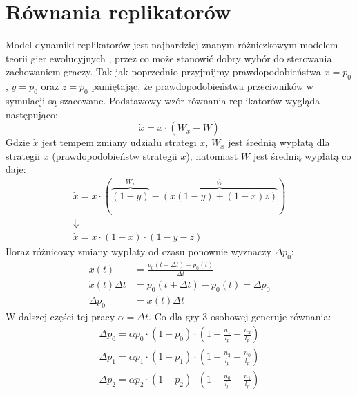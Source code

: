 
\section{Równania replikatorów}
\label{sec:r_repli}
Model dynamiki replikatorów jest najbardziej znanym różniczkowym modelem teorii gier ewolucyjnych \cite{Now06}\cite{Hof98}, przez co może stanowić dobry wybór do sterowania zachowaniem graczy. Tak jak poprzednio przyjmijmy prawdopodobieństwa $x=p_0$, $y=p_0$ oraz $z=p_0$ pamiętając, że prawdopodobieństwa przeciwników w symulacji są szacowane. Podstawowy wzór równania replikatorów wygląda następująco:
\begin{equation}
\dot{x} = x \cdot ( W_x - \overline{W})
\end{equation}
Gdzie $\dot{x}$ jest tempem zmiany udziału strategi $x$, $W_x$ jest średnią wypłatą dla strategii $x$ (prawdopodobieństw strategii $x$), natomiast $\overline{W}$ jest średnią wypłatą co daje:
\begin{gather*}
\dot{x} = x \cdot ( \overbrace{(1-y)}^{W_x} - \overbrace{(x(1-y) + (1-x)z)}^{\overline{W}}) \\
\Downarrow \\
\dot{x} = x \cdot (1-x) \cdot (1-y-z)
\end{gather*}
Iloraz różnicowy zmiany wypłaty od czasu ponownie wyznaczy $\Delta p_0$:
\begin{align*}
\dot{x}(t) &= \frac{p_0(t+\Delta t)-p_0(t)}{\Delta t} \\
\dot{x}(t) \Delta t &= p_0(t+\Delta t)-p_0(t) = \Delta p_0 \\
\Delta p_0 &= \dot{x}(t) \Delta t
\end{align*} 
W dalszej części tej pracy $\alpha=\Delta t$. Co dla gry 3-osobowej generuje równania:
\begin{align} \label{eq:repli}
\Delta p_0 = \alpha p_0 \cdot (1 - p_0) \cdot (1 - \frac{n_1}{l_p} - \frac{n_2}{l_p}) \nonumber \\
\Delta p_1 = \alpha p_1 \cdot (1 - p_1) \cdot (1 - \frac{n_2}{l_p} - \frac{n_0}{l_p}) \\
\Delta p_2 = \alpha p_2 \cdot (1 - p_2) \cdot (1 - \frac{n_0}{l_p} - \frac{n_1}{l_p}) \nonumber
\end{align} 


